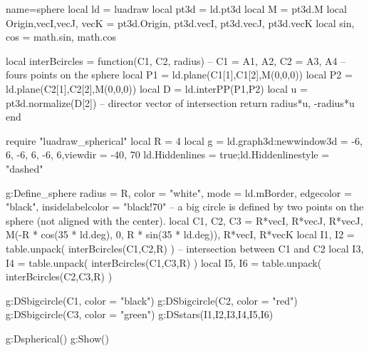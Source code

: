\documentclass{standalone}
\begin{document}
\begin{luadraw}{name=sphere}
    local ld = luadraw
    local pt3d = ld.pt3d
    local M = pt3d.M
    local Origin,vecI,vecJ, vecK = pt3d.Origin, pt3d.vecI, pt3d.vecJ, pt3d.vecK
    local sin, cos = math.sin, math.cos
    
    local interBcircles = function(C1, C2, radius)
        -- C1 = {A1, A2}, C2 = {A3, A4} --fours points on the sphere
        local P1 = ld.plane(C1[1],C1[2],M(0,0,0))
        local P2 = ld.plane(C2[1],C2[2],M(0,0,0))
        local D = ld.interPP(P1,P2)
        local u = pt3d.normalize(D[2]) -- director vector of intersection
        return {radius*u, -radius*u}
    end

    require "luadraw_spherical"
    local R = 4
    local g = ld.graph3d:new{window3d = {-6, 6, -6, 6, -6, 6},viewdir = {-40, 70}}
    ld.Hiddenlines = true;ld.Hiddenlinestyle = "dashed"

    g:Define_sphere{
        radius = R,
        color = "white",
        mode = ld.mBorder,
        edgecolor = "black",
        insidelabelcolor = "black!70"
    }
    -- a big circle is defined by two points on the sphere (not aligned with the center).
    local C1, C2, C3 = {R*vecI, R*vecJ}, {R*vecJ, M(-R * cos(35 * ld.deg), 0, R * sin(35 * ld.deg))}, {R*vecI, R*vecK}
    local I1, I2 = table.unpack( interBcircles(C1,C2,R) ) -- intersection between C1 and C2
    local I3, I4 = table.unpack( interBcircles(C1,C3,R) )
    local I5, I6 = table.unpack( interBcircles(C2,C3,R) )

    g:DSbigcircle(C1, {color = "black"})
    g:DSbigcircle(C2, {color = "red"})
    g:DSbigcircle(C3, {color = "green"})
    g:DSstars({I1,I2,I3,I4,I5,I6})
    
    g:Dspherical()
    g:Show()
\end{luadraw}
\end{document}
